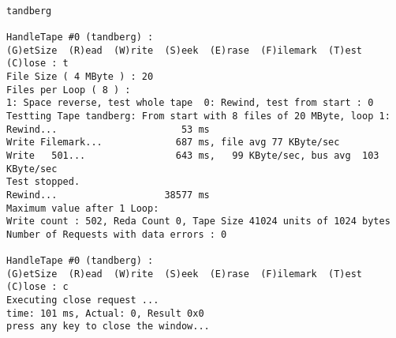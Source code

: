 \begin{screendump}
  \begin{verbatim}
                                                                        tandberg

HandleTape #0 (tandberg) :
(G)etSize  (R)ead  (W)rite  (S)eek  (E)rase  (F)ilemark  (T)est  (C)lose : t
File Size ( 4 MByte ) : 20
Files per Loop ( 8 ) :
1: Space reverse, test whole tape  0: Rewind, test from start : 0
Testting Tape tandberg: From start with 8 files of 20 MByte, loop 1:
Rewind...                      53 ms
Write Filemark...             687 ms, file avg 77 KByte/sec
Write   501...                643 ms,   99 KByte/sec, bus avg  103 KByte/sec
Test stopped.
Rewind...                   38577 ms
Maximum value after 1 Loop:
Write count : 502, Reda Count 0, Tape Size 41024 units of 1024 bytes
Number of Requests with data errors : 0

HandleTape #0 (tandberg) :
(G)etSize  (R)ead  (W)rite  (S)eek  (E)rase  (F)ilemark  (T)est  (C)lose : c
Executing close request ...
time: 101 ms, Actual: 0, Result 0x0
press any key to close the window...
  \end{verbatim}
\end{screendump}
